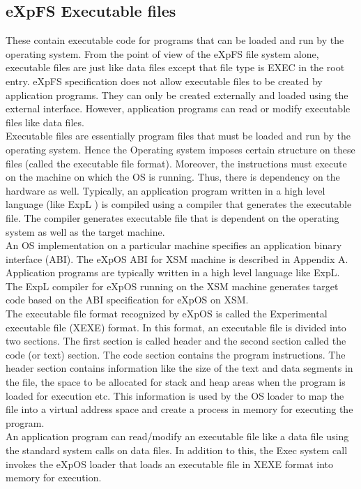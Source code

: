 \subsection{eXpFS Executable files}
 These contain executable code for programs that can be loaded and run by the operating system. From the point of view of the eXpFS file system alone, executable files are just like data files except that file type is EXEC in the root entry. eXpFS specification does not allow executable files to be created by application programs. They can only be created externally and loaded using the external interface. However, application programs can read or modify executable files like data files.
\\
Executable files are essentially program files that must be loaded and run by the operating system. Hence the Operating system imposes certain structure on these files (called the executable file format). Moreover, the instructions must execute on the machine on which the OS is running. Thus, there is dependency on the hardware as well. Typically, an application program written in a high level language (like ExpL ) is compiled using a compiler that generates the executable file. The compiler generates executable file that is dependent on the operating system as well as the target machine.
\\
An OS implementation on a particular machine specifies an application binary interface (ABI). The eXpOS ABI for XSM machine is described in Appendix A. Application programs are typically written in a high level language like ExpL. The ExpL compiler for eXpOS running on the XSM machine generates target code based on the ABI specification for eXpOS on XSM.
\\
The executable file format recognized by eXpOS is called the Experimental executable file (XEXE) format. In this format, an executable file is divided into two sections. The first section is called header and the second section called the code (or text) section. The code section contains the program instructions. The header section contains information like the size of the text and data segments in the file, the space to be allocated for stack and heap areas when the program is loaded for execution etc. This information is used by the OS loader to map the file into a virtual address space and create a process in memory for executing the program.
\\
An application program can read/modify an executable file like a data file using the standard system calls on data files. In addition to this, the Exec system call invokes the eXpOS loader that loads an executable file in XEXE format into memory for execution. 
